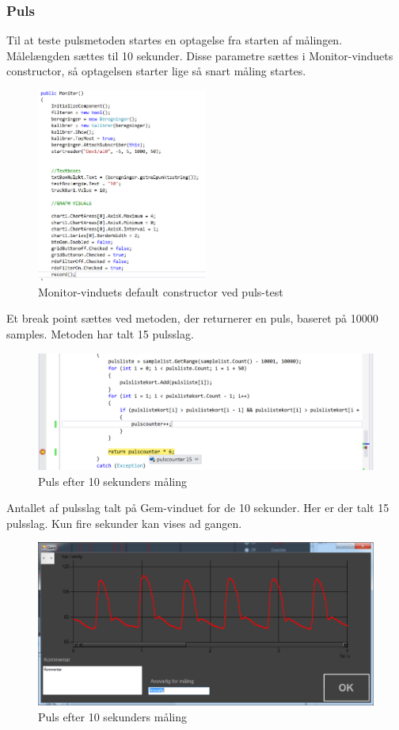 \subsubsection{Puls}
Til at teste pulsmetoden startes en optagelse fra starten af målingen. Målelængden sættes til 10 sekunder. Disse parametre sættes i Monitor-vinduets constructor, så optagelsen starter lige så snart måling startes.
\begin{figure}[H]
	\centering
	\includegraphics[width=0.5\textwidth]{Figurer/Pulstest_record}
	\caption{Monitor-vinduets default constructor ved puls-test}
\end{figure}
Et break point sættes ved metoden, der returnerer en puls, baseret på 10000 samples. Metoden har talt 15 pulsslag.
\begin{figure}[H]
	\centering
	\includegraphics[width=1\textwidth]{Figurer/Pulstest_debug}
	\caption{Puls efter 10 sekunders måling}
\end{figure}
Antallet af pulsslag talt på Gem-vinduet for de 10 sekunder. Her er der talt 15 pulsslag. Kun fire sekunder kan vises ad gangen.
\begin{figure}[H]
	\centering
	\includegraphics[width=1\textwidth]{Figurer/Pulstest_gemmevindue}
	\caption{Puls efter 10 sekunders måling}
\end{figure}

